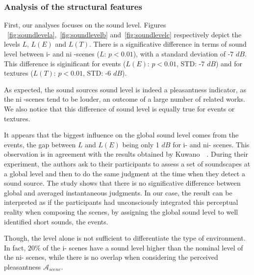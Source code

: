\documentclass[twoside,twocolumn]{article}
\begin{document}
\subsubsection*{Analysis of the structural features}

First, our analyses focuses on the sound level. Figures ~\ref{fig:soundlevela},~\ref{fig:soundlevelb} and~\ref{fig:soundlevelc} respectively depict the levels $L$, $L(E)$ and $L(T)$. There is a significative difference in terms of sound level between i- and ni -scenes ($L$: $p<0.01$), with a standard deviation of -7 $dB$. This difference is siginificant for events ($L(E)$: $p<0.01$, STD: -7 $dB$) and for textures ($L(T)$: $p<0.01$, STD: -6 $dB$).

As expected, the sound sources sound level is indeed a pleasantness indicator, as the ni -scenes tend to be louder, an outcome of a large number of related works. We also notice that this difference of sound level is equally true for events or textures.

It appears that the biggest influence on the global sound level comes from the events, the gap between $L$ and $L(E)$ being only 1 $dB$ for i- and ni- scenes. This observation is in agreement with the results obtained by Kuwano~\al~\cite{kuwano_memory_2003}. During their experiment, the authors ask to their participants to assess a set of soundscapes at a global level and then to do the same judgment at the time when they detect a sound source. The study shows that there is no significative difference between global and averaged instantaneous judgments. In our case, the result can be interpreted as if the participants had unconsciously integrated this perceptual reality when composing the scenes, by assigning the global sound level to well identified short sounds, \ie the events.

Though, the level alone is not sufficient to differentiate the type of environment. In fact, $20\%$ of the i- scenes have a sound level higher than the nominal level of the ni- scenes, while there is no overlap when considering the perceived pleasantness $\mathcal{A}_{scene}$.
\end{document}
